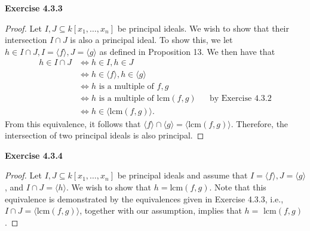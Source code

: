 \documentclass[12pt,oneside]{article}
\newenvironment{exercise}[1]{\vspace{.1in}\noindent\textbf{Exercise #1 \hspace{.05em}}}{}
\begin{document}
\begin{exercise}{4.3.3}
    \begin{proof}
        Let $I,J \subseteq k[x_1,\ldots,x_n]$ be principal ideals. We wish to show that 
        their intersection $I \cap J$ is also a principal ideal. To show this, we let 
        $h \in I \cap J, I= \langle f \rangle, J= \langle g \rangle$ as defined in 
        Proposition 13. We then have that 
        \begin{align*}
            h \in I \cap J  &\Leftrightarrow h\in I, h\in J\\
                            &\Leftrightarrow h \in \langle f \rangle, h \in \langle g \rangle\\
                            &\Leftrightarrow h \text{ is a multiple of }f, g\\
                            &\Leftrightarrow h \text{ is a multiple of lcm}(f,g) && \text{by Exercise 4.3.2}\\
                            &\Leftrightarrow h \in \langle \text{lcm}(f,g)\rangle.
        \end{align*}
        From this equivalence, it follows that 
        $\langle f \rangle \cap \langle g \rangle = \langle$lcm$(f,g)\rangle$. Therefore, 
        the intersection of two principal ideals is also principal.
    \end{proof}
\end{exercise}


\begin{exercise}{4.3.4}
    \begin{proof}
        Let $I,J \subseteq k[x_1,\ldots,x_n]$ be principal ideals and assume that 
        $I=\langle f \rangle, J = \langle g \rangle$, and $I\cap J = \langle h \rangle$. 
        We wish to show that $h = $lcm$(f,g)$. Note that this equivalence is demonstrated 
        by the equivalences given in Exercise 4.3.3, i.e., 
        $I\cap J = \langle\text{lcm}(f,g)\rangle$, together with our assumption, implies that 
        $h = $ lcm$(f,g)$.
    \end{proof}
\end{exercise}
\end{document}
